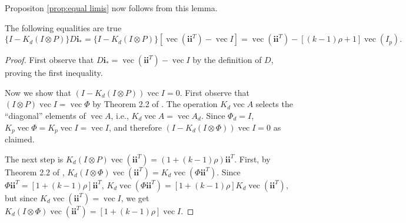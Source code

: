 \documentclass[twoside]{article}
\DeclareMathOperator{\vvec}{vec}
\begin{document}
Propositon \ref{prop:equal limis} now follows from this lemma.
\begin{lem}
The following equalities are true
\begin{equation*}
 \{I-K_{d}(I\otimes P)\}D\mathbf{i}_{*}
= \{I-K_{d}(I\otimes P)\}[\vvec(\mathbf{i}\mathbf{i}^{T})-\vvec I]
= \vvec(\mathbf{i}\mathbf{i}^{T})-[(k-1)\rho+1]\vvec(I_{p}).
\end{equation*}
\end{lem}

\begin{proof}
First observe that $D\mathbf{i}_{*}=\vvec(\mathbf{i}\mathbf{i}^{T})-\vvec I$
by the definition of $D$, proving the first inequality. 

Now we show that $(I-K_{d}(I\otimes P))\vvec I=0$. First observe
that $(I\otimes P)\vvec I=\vvec\Phi$ by Theorem 2.2 of \citet{Magnus2019-cz}.
The operation $K_{d}\vvec A$ selects the ``diagonal'' elements
of $\vvec A$, i.e., $K_{d}\vvec A=\vvec A_{d}$. Since $\Phi_{d}=I$,
$K_{p}\vvec\Phi=K_{p}\vvec I=\vvec I$, and therefore $(I-K_{d}(I\otimes\Phi))\vvec I=0$
as claimed.

The next step is $K_{d}(I\otimes P)\vvec(\mathbf{i}\mathbf{i}^{T})=(1+(k-1)\rho)\mathbf{i}\mathbf{i}^{T}$.
First, by Theorem 2.2 of \citet{Magnus2019-cz}, $K_{d}(I\otimes\Phi)\vvec(\mathbf{i}\mathbf{i}^{T})=K_{d}\vvec(\Phi\mathbf{i}\mathbf{i}^{T})$.
Since $\Phi\mathbf{i}\mathbf{i}^{T}=[1+(k-1)\rho]\mathbf{i}\mathbf{i}^{T}$,
$K_{d}\vvec(\Phi\mathbf{i}\mathbf{i}^{T})=[1+(k-1)\rho]K_{d}\vvec(\mathbf{i}\mathbf{i}^{T})$,
but since $K_{d}\vvec(\mathbf{i}\mathbf{i}^{T})=\vvec I$, we get
$K_{d}(I\otimes\Phi)\vvec(\mathbf{i}\mathbf{i}^{T})=[1+(k-1)\rho]\vvec I$.
\end{proof}


\end{document}
